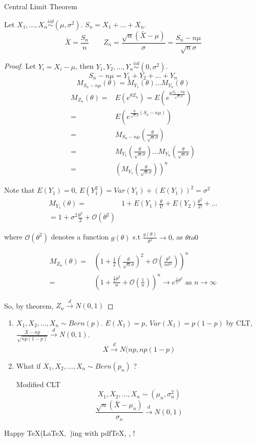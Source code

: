 \begin{theo}
Central Limit Theorem

Let $X_1,\dots,X_n \overset{iid}{\sim} (\mu,\sigma^2)$. $S_n=X_1+\dots+X_n$.
\[\bar{X}=\frac{S_n}{n} \qquad Z_n=\frac{\sqrt{n}(\bar{X}-\mu)}{\sigma}=\frac{S_n-n\mu}{\sqrt{n}\sigma}\]

\begin{proof}
Let $Y_i=X_i-\mu$, then $Y_1,Y_2,\dots,Y_n\overset{iid}{\sim} (0,\sigma^2)$.
\[S_n-n\mu=Y_1+Y_2+\dots+Y_n\]
\[M_{S_n-n\mu}(\theta)=M_{Y_1}(\theta)\dots M_{Y_n}(\theta)\]
\begin{align*}
M_{Z_n}(\theta)= & E(e^{\theta Z_n})=E\left(e^{\theta \frac{S_n-n\mu}{\sqrt{n}\sigma}} \right) \\
= & E\left(e^{\frac{\theta}{\sqrt{n}\sigma}(S_n-n\mu)} \right) \\
= & M_{S_n-n\mu} \left(\frac{\theta}{\sqrt{n}\sigma}\right) \\
= & M_{Y_1}\left(\frac{\theta}{\sqrt{n}\sigma}\right) \dots M_{Y_n}\left(\frac{\theta}{\sqrt{n}\sigma}\right)\\
= & \left(M_{Y_1}\left(\frac{\theta}{\sqrt{n}\sigma}\right)\right)^n
\end{align*}

Note that $E(Y_1)=0$, $E(Y_1^2)=Var(Y_1)+(E(Y_1))^2=\sigma^2$
\begin{align*}
M_{Y_1}(\theta) =& 1+ E(Y_1) \frac{\theta}{1!} + E(Y_2) \frac{\theta^2}{2!} +\dots \\
= 1+ \sigma^2 \frac{\theta^2}{2} + \mathcal{O}(\theta^2)
\end{align*}

where $\mathcal{O}(\theta^2)$ denotes a function $g(\theta)$ s.t $\frac{g(\theta)}{\theta^2}\to 0$, as $\theta to 0$

\begin{align*}
M_{Z_n}(\theta) =& \left(		1+\frac{1}{2}\left(\frac{\theta}{\sqrt{n}\sigma}\right)^2+\mathcal{O}\left(\frac{\theta^2}{n\sigma^2}\right)		\right)^n \\
= & \left(		1+\frac{\frac{1}{2}\theta^2}{n}+\mathcal{O}\left(\frac{1}{n}\right)		\right)^n \longrightarrow e^{\frac{1}{2}\theta^2} \text{ as } n\to\infty
\end{align*}

So, by theorem, $Z_n\overset{d}{\longrightarrow}N(0,1)$
\end{proof}
\end{theo}

\begin{enumerate}
\item $X_1,X_2,\dots,X_n \sim Bern(p)$. $E(X_1)=p$, $Var(X_1)=p(1-p)$
by CLT, $\frac{X-np}{\sqrt{np(1-p)}}\overset{d}{\longrightarrow}N(0,1)$.
\[X \overset{d}{\longrightarrow}N(np,np(1-p)\]
\item What if $X_1,X_2,\dots,X_n \sim Bern(p_n)$ ?

Modified CLT
\[X_1,X_2,\dots,X_n \sim (\mu_n,\sigma_n^2)\]
\[\frac{\sqrt{n}(\bar{X}-\mu_n)}{\sigma_n} \overset{d}{\longrightarrow} N(0,1)\]
\end{enumerate}

Happy \TeX(\LaTeX,~\LaTeXe)ing with pdf\TeX, \XeTeX, \LuaTeX!